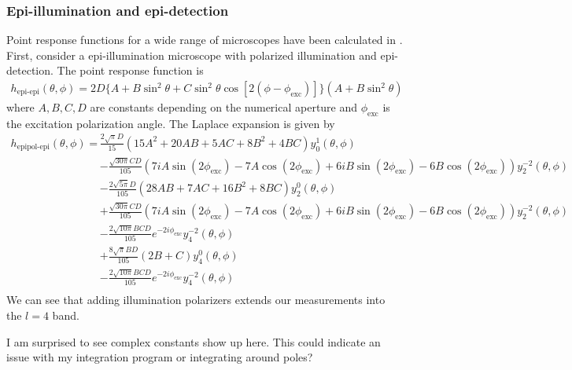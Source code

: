 \documentclass[10pt]{article}
\begin{document}
\subsubsection{Epi-illumination and epi-detection}
Point response functions for a wide range of microscopes have been calculated in
\cite{chandler}. First, consider a epi-illumination microscope with polarized
illumination and epi-detection. The point response function is
\begin{align}
  h_{\text{epi-epi}}(\theta, \phi) = 2D\{A+B\sin^2\theta + C\sin^2\theta\cos[2(\phi - \phi_{\text{exc}})]\}(A + B\sin^2\theta)
\end{align}
where $A, B, C, D$ are constants depending on the numerical aperture and $\phi_{\text{exc}}$ is the excitation polarization angle. The Laplace expansion is given by
\begin{align*}
  h_{\text{epipol-epi}}(\theta, \phi) = &\frac{2\sqrt{\pi}D}{15}(15A^2 + 20AB + 5AC + 8B^2 + 4BC)y_0^1(\theta, \phi)\\
                                     &-\frac{\sqrt{30\pi}CD}{105}(7iA\sin(2\phi_{\text{exc}}) - 7A\cos(2\phi_{\text{exc}}) + 6iB\sin(2\phi_{\text{exc}}) - 6B\cos(2\phi_{\text{exc}}))y_2^{-2}(\theta, \phi)\\
                                     &-\frac{2\sqrt{5\pi}D}{105}(28AB + 7AC + 16B^2 + 8BC)y_2^0(\theta, \phi)\\
                                     &+\frac{\sqrt{30\pi}CD}{105}(7iA\sin(2\phi_{\text{exc}}) - 7A\cos(2\phi_{\text{exc}}) + 6iB\sin(2\phi_{\text{exc}}) - 6B\cos(2\phi_{\text{exc}}))y_2^{-2}(\theta, \phi)\\
                                     &-\frac{2\sqrt{10\pi}BCD}{105}e^{-2i\phi_{\text{exc}}}y_4^{-2}(\theta, \phi)\\
                                     &+\frac{8\sqrt{\pi}BD}{105}(2B + C)y_4^{0}(\theta, \phi)\\
                                     &-\frac{2\sqrt{10\pi}BCD}{105}e^{-2i\phi_{\text{exc}}}y_4^{-2}(\theta, \phi)\\
\end{align*}
We can see that adding illumination polarizers extends our measurements into the
$l=4$ band.

I am surprised to see complex constants show up here. This could indicate an issue
with my integration program or integrating around poles?
\end{document}
